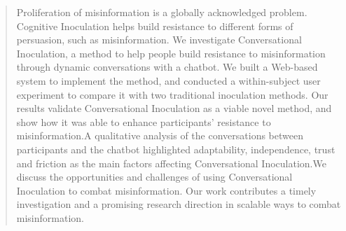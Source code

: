 \documentclass[sigconf]{acmart}
\begin{document}
\begin{abstract}


Proliferation of misinformation is a globally acknowledged problem. Cognitive Inoculation helps build resistance to different forms of persuasion, such as misinformation. We investigate Conversational Inoculation, a method to help people build resistance to misinformation through dynamic conversations with a chatbot. We built a Web-based system to implement the method, and conducted a within-subject user experiment to compare it with two traditional inoculation methods. Our results validate Conversational Inoculation as a viable novel method, and show how it was able to enhance participants' resistance to misinformation.A qualitative analysis of the conversations between participants and the chatbot highlighted adaptability, independence, trust and friction as the main factors affecting Conversational Inoculation.We discuss the opportunities and challenges of using Conversational Inoculation to combat misinformation. Our work contributes a timely investigation and a promising research direction in scalable ways to combat misinformation.



\end{abstract}

\end{document}
